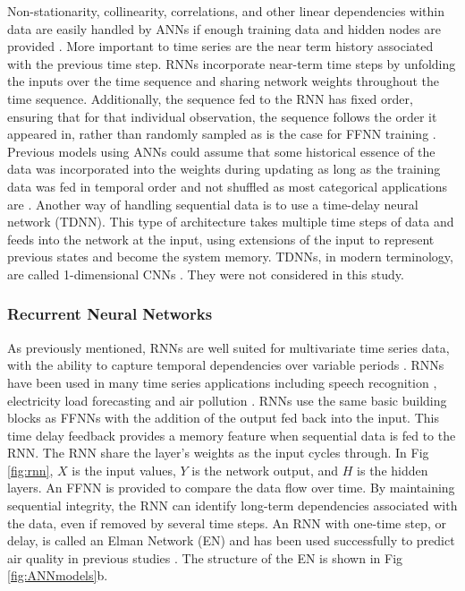Non-stationarity, collinearity, correlations, and other linear dependencies within data are easily handled by ANNs if enough training data and hidden nodes are provided \citep{Goodfellow2016}. More important to time series are the near term history associated with the previous time step. RNNs incorporate near-term time steps by unfolding the inputs over the time sequence and sharing network weights throughout the time sequence. Additionally, the sequence fed to the RNN has fixed order, ensuring that for that individual observation, the sequence follows the order it appeared in, rather than randomly sampled as is the case for FFNN training \citep{Elangasinghe2014}. Previous models using ANNs could assume that some historical essence of the data was incorporated into the weights during updating as long as the training data was fed in temporal order and not shuffled as most categorical applications are \citep{Bengio2012}. Another way of handling sequential data is to use a time-delay neural network (TDNN). This type of architecture takes multiple time steps of data and feeds into the network at the input, using extensions of the input to represent previous states and become the system memory. TDNNs, in modern terminology, are called 1-dimensional CNNs \citep{Goodfellow2016}. They were not considered in this study.

\subsubsection{Recurrent Neural Networks}
As previously mentioned, RNNs are well suited for multivariate time series data, with the ability to capture temporal dependencies over variable periods \citep{Che2016}. RNNs have been used in many time series applications including speech recognition \citep{Graves2013}, electricity load forecasting \citep{Walid2017} and air pollution \citep{Gomez2003, Fan2017}. RNNs use the same basic building blocks as FFNNs with the addition of the output fed back into the input. This time delay feedback provides a memory feature when sequential data is fed to the RNN. The RNN share the layer's weights as the input cycles through. In Fig \ref{fig:rnn}, $X$ is the input values, $Y$ is the network output, and $H$ is the hidden layers. An FFNN is provided to compare the data flow over time. By maintaining sequential integrity, the RNN can identify long-term dependencies associated with the data, even if removed by several time steps. An RNN with one-time step, or delay, is called an Elman Network (EN) and has been used successfully to predict air quality in previous studies \citep{Biancofiore2015, Biancofiore2017}. The structure of the EN is shown in Fig \ref{fig:ANNmodels}b.

